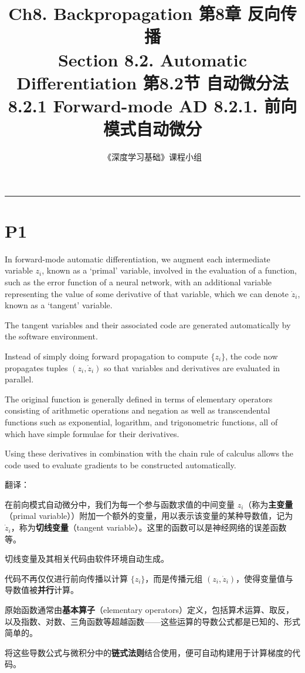 \documentclass{article}
\title{Ch8. Backpropagation \hfill 第8章 反向传播 \\ 
Section 8.2. Automatic Differentiation \hfill 第8.2节 自动微分法 \\ 
8.2.1 Forward-mode AD \hfill 8.2.1. 前向模式自动微分}
\author{《深度学习基础》课程小组}
\begin{document}
\maketitle

\setlength{\parindent}{0pt} %
\setlength{\parskip}{1.5em} %

\noindent\rule{\linewidth}{0.4pt}

\section{P1}

In forward-mode automatic differentiation, we augment each intermediate variable $z_i$, known as a `primal' variable, involved in the evaluation of a function, such as the error function of a neural network, with an additional variable representing the value of some derivative of that variable, which we can denote $\dot{z}_i$, known as a `tangent' variable. 

The tangent variables and their associated code are generated automatically by the software environment. 

Instead of simply doing forward propagation to compute $\{z_i\}$, the code now propagates tuples $(z_i, \dot{z}_i)$ so that variables and derivatives are evaluated in parallel. 

The original function is generally defined in terms of elementary operators consisting of arithmetic operations and negation as well as transcendental functions such as exponential, logarithm, and trigonometric functions, all of which have simple formulae for their derivatives. 

Using these derivatives in combination with the chain rule of calculus allows the code used to evaluate gradients to be constructed automatically.


{\color{red}
翻译：%

在前向模式自动微分中，我们为每一个参与函数求值的中间变量 $z_i$（称为\textbf{主变量}（primal variable））附加一个额外的变量，用以表示该变量的某种导数值，记为 $\dot{z}_i$，称为\textbf{切线变量}（tangent variable）。这里的函数可以是神经网络的误差函数等。

切线变量及其相关代码由软件环境自动生成。

代码不再仅仅进行前向传播以计算 $\{z_i\}$，而是传播元组 $(z_i, \dot{z}_i)$，使得变量值与导数值被\textbf{并行}计算。

原始函数通常由\textbf{基本算子}（elementary operators）定义，包括算术运算、取反，以及指数、对数、三角函数等超越函数——这些运算的导数公式都是已知的、形式简单的。

将这些导数公式与微积分中的\textbf{链式法则}结合使用，便可自动构建用于计算梯度的代码。
}
\end{document}

